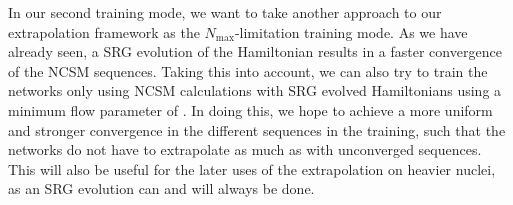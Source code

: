 In our second training mode, we want to take another approach to our extrapolation framework as the $N_\mathrm{max}$-limitation training mode. As we have already seen, a SRG evolution of the Hamiltonian results in a faster convergence of the NCSM sequences. Taking this into account, we can also try to train the networks only using NCSM calculations with SRG evolved Hamiltonians using a minimum flow parameter of . In doing this, we hope to achieve a more uniform and stronger convergence in the different sequences in the training, such that the networks do not have to extrapolate as much as with unconverged sequences. This will also be useful for the later uses of the extrapolation on heavier nuclei, as an SRG evolution can and will always be done.
